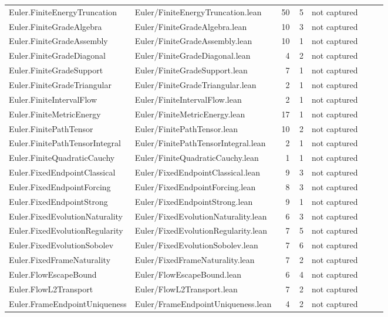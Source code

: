 \documentclass[10pt]{article}
\begin{document}
\begin{longtable}{p{0.28\linewidth}p{0.27\linewidth}r r p{0.20\linewidth}}
Euler.FiniteEnergyTruncation & Euler/FiniteEnergyTruncation.lean & 50 & 5 & not captured\\
Euler.FiniteGradeAlgebra & Euler/FiniteGradeAlgebra.lean & 10 & 3 & not captured\\
Euler.FiniteGradeAssembly & Euler/FiniteGradeAssembly.lean & 10 & 1 & not captured\\
Euler.FiniteGradeDiagonal & Euler/FiniteGradeDiagonal.lean & 4 & 2 & not captured\\
Euler.FiniteGradeSupport & Euler/FiniteGradeSupport.lean & 7 & 1 & not captured\\
Euler.FiniteGradeTriangular & Euler/FiniteGradeTriangular.lean & 2 & 1 & not captured\\
Euler.FiniteIntervalFlow & Euler/FiniteIntervalFlow.lean & 2 & 1 & not captured\\
Euler.FiniteMetricEnergy & Euler/FiniteMetricEnergy.lean & 17 & 1 & not captured\\
Euler.FinitePathTensor & Euler/FinitePathTensor.lean & 10 & 2 & not captured\\
Euler.FinitePathTensorIntegral & Euler/FinitePathTensorIntegral.lean & 2 & 1 & not captured\\
Euler.FiniteQuadraticCauchy & Euler/FiniteQuadraticCauchy.lean & 1 & 1 & not captured\\
Euler.FixedEndpointClassical & Euler/FixedEndpointClassical.lean & 9 & 3 & not captured\\
Euler.FixedEndpointForcing & Euler/FixedEndpointForcing.lean & 8 & 3 & not captured\\
Euler.FixedEndpointStrong & Euler/FixedEndpointStrong.lean & 9 & 1 & not captured\\
Euler.FixedEvolutionNaturality & Euler/FixedEvolutionNaturality.lean & 6 & 3 & not captured\\
Euler.FixedEvolutionRegularity & Euler/FixedEvolutionRegularity.lean & 7 & 5 & not captured\\
Euler.FixedEvolutionSobolev & Euler/FixedEvolutionSobolev.lean & 7 & 6 & not captured\\
Euler.FixedFrameNaturality & Euler/FixedFrameNaturality.lean & 7 & 2 & not captured\\
Euler.FlowEscapeBound & Euler/FlowEscapeBound.lean & 6 & 4 & not captured\\
Euler.FlowL2Transport & Euler/FlowL2Transport.lean & 7 & 2 & not captured\\
Euler.FrameEndpointUniqueness & Euler/FrameEndpointUniqueness.lean & 4 & 2 & not captured\\

\end{longtable}
\end{document}
